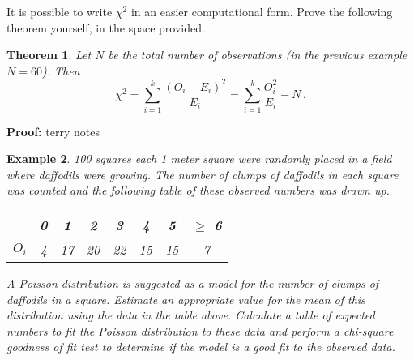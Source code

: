 \documentclass[12pt]{article}
\theoremstyle{break}
\newtheorem{theorem}{Theorem}[section]
\newtheorem{example}[theorem]{Example}
\begin{document}
It is possible to write $\chi^2$ in an easier computational form. Prove the following theorem yourself, in the space provided.
\begin{theorem}
Let $N$ be the total number of observations {(\rm in the previous example $N=60$)}. Then
$$
\chi^{2}=\sum_{i=1}^{k}\frac{(O_{i}-E_{i})^2}{E_{i}}=\sum_{i=1}^{k}\frac{O_{i}^{2}}{E_{i}}-N \, .
$$
\end{theorem}

\begin{mdframed}
{\bf Proof:}
\textcolor[rgb]{1.00,1.00,1.00}{terry notes\lipsum[1-7]}
\end{mdframed}

\begin{example}
100 squares each 1 meter square were randomly placed in a field where daffodils were growing. The number of clumps of daffodils in each square was counted and the following table of these observed numbers was drawn up.
\begin{center}
\begin{tabular}{|c|c|c|c|c|c|c|c|}
  \hline
   & 0 & 1 & 2 & 3 & 4 & 5 & $\geq$ 6\\ \hline
  $O_{i}$ & 4 & 17 & 20 & 22 & 15 & 15 & 7 \\
  \hline
\end{tabular}
\end{center}
A Poisson distribution is suggested as a model for the number of clumps of daffodils in a square. Estimate an appropriate value for the mean of this distribution using the data in the table above. Calculate a table of expected numbers to fit the Poisson distribution to these data and perform a chi-square goodness of fit test to determine if the model is a good fit to the observed data.
\end{example}
\end{document}
